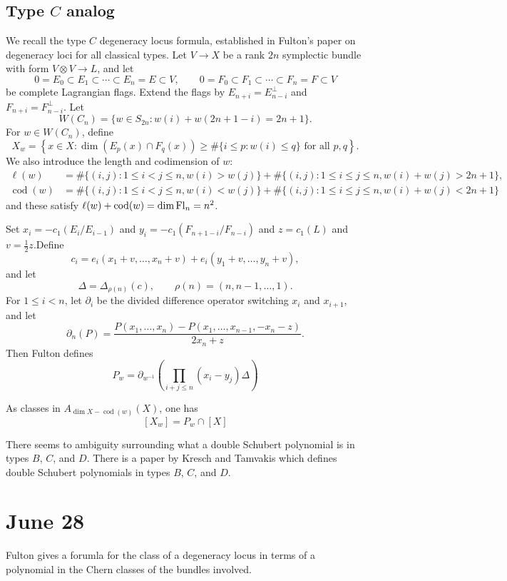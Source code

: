 \documentclass[12pt]{article}
\begin{document}
\subsection{Type $C$ analog}
We recall the type $C$ degeneracy locus formula, established in Fulton's paper on degeneracy loci for all classical types.
Let \(V\to X\) be a rank \(2n\) symplectic bundle with form
\(V\otimes V\to L\), and let
\[
    0=E_0\subset E_1\subset\cdots\subset E_n=E\subset V,
    \qquad
    0=F_0\subset F_1\subset\cdots\subset F_n=F\subset V
\]
be complete Lagrangian flags. Extend the flags by $ E_{n+i}=E_{n-i}^{\perp}$ and $F_{n+i}=F_{n-i}^{\perp}$. Let
\[
    W(C_n)=\{w\in S_{2n}:w(i)+w(2n+1-i)=2n+1\}.
\]
For \(w\in W(C_n)\), define
\[
    X_w=
    \left\{
    x\in X:
    \dim(E_p(x)\cap F_q(x))
    \geq
    \#\{i\leq p:w(i)\leq q\}
    \text{ for all }p,q
    \right\}.
\]
We also introduce the length and codimension of \(w\): \begin{align*}
    \ell(w)               & =\#\{(i,j):1\leq i<j\leq n,w(i)>w(j)\} + \#\{(i,j):1\leq i\leq j\leq n,w(i)+w(j)>2n+1\}, \\
    \operatorname{cod}(w) & = \#\{(i,j):1\leq i<j\leq n,w(i)<w(j)\} + \#\{(i,j):1\leq i\leq j\leq n,w(i)+w(j)<2n+1\}
\end{align*} and these satisfy $\ell(w)+\operatorname{cod}(w)= \dim \operatorname{Fl}_n = n^2$.

Set $x_i=-c_1(E_i/E_{i-1})$ and $y_i=-c_1(F_{n+1-i}/F_{n-i})$ and $z=c_1(L)$ and $v=\frac12 z$.Define
\[
    c_i=
    e_i(x_1+v,\ldots,x_n+v)
    +
    e_i(y_1+v,\ldots,y_n+v),
\]
and let
\[
    \Delta=\Delta_{\rho(n)}(c),
    \qquad
    \rho(n)=(n,n-1,\ldots,1).
\]
For \(1\le i<n\), let \(\partial_i\) be the divided difference operator
switching \(x_i\) and \(x_{i+1}\), and let
\[
    \partial_n(P)
    =
    \frac{
    P(x_1,\ldots,x_n)
    -
    P(x_1,\ldots,x_{n-1},-x_n-z)
    }{2x_n+z}.
\]
Then Fulton defines
\[
    P_w
    =
    \partial_{w^{-1}}
    \left(
    \prod_{i+j\le n}(x_i-y_j)\Delta
    \right)
\]
\begin{theorem}
    As classes in $A_{\dim X-\operatorname{cod}(w)}(X)$, one has
    \[
        [X_w]=P_w\cap [X]
    \]
\end{theorem}
There seems to ambiguity surrounding what a double Schubert polynomial is in types $B$, $C$, and $D$. There is a paper by Kresch and Tamvakis which defines double Schubert polynomials in types $B$, $C$, and $D$.

\section{June 28}
Fulton gives a forumla for the class of a degeneracy locus in terms of a polynomial in the Chern classes of the bundles involved.
\end{document}
